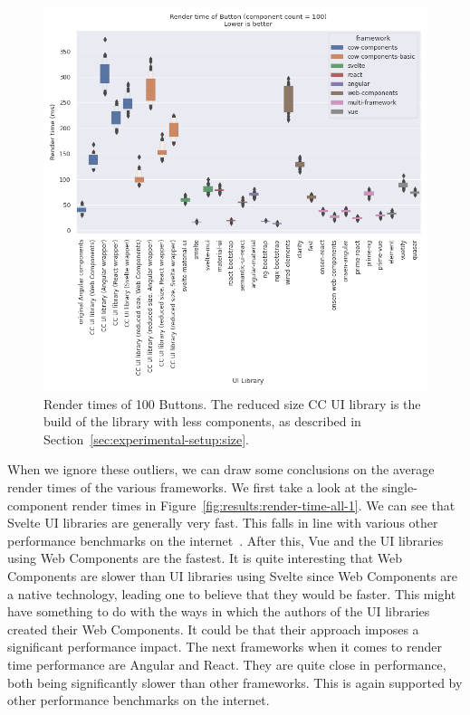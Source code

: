 \begin{figure}[h]
	\includegraphics[width=\columnwidth]{plots/render-time-all-100-Button.png}
	\caption{Render times of 100 Buttons. The reduced size CC UI library is the build of the library with less components, as described in Section~\ref{sec:experimental-setup:size}.}
	\label{fig:results:render-time-all-100}
	\centering
\end{figure}

When we ignore these outliers, we can draw some conclusions on the average render times of the various frameworks. We first take a look at the single-component render times in Figure~\ref{fig:results:render-time-all-1}. We can see that Svelte UI libraries are generally very fast. This falls in line with various other performance benchmarks on the internet~. After this, Vue and the UI libraries using Web Components are the fastest. It is quite interesting that Web Components are slower than UI libraries using Svelte since Web Components are a native technology, leading one to believe that they would be faster. This might have something to do with the ways in which the authors of the UI libraries created their Web Components. It could be that their approach imposes a significant performance impact. The next frameworks when it comes to render time performance are Angular and React. They are quite close in performance, both being significantly slower than other frameworks. This is again supported by other performance benchmarks on the internet.

